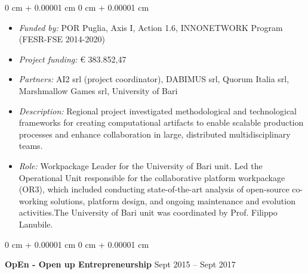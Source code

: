 \documentclass[10pt, a4paper]{article}
\newenvironment{highlights}{
    \begin{itemize}[
        topsep=0.10 cm,
        parsep=0.10 cm,
        partopsep=0pt,
        itemsep=0pt,
        leftmargin=0 cm + 10pt
    ]
}{
    \end{itemize}
} %
\newenvironment{onecolentry}{
    \begin{adjustwidth}{
        0 cm + 0.00001 cm
    }{
        0 cm + 0.00001 cm
    }
}{
    \end{adjustwidth}
} %
\newenvironment{twocolentry}[2][]{
    \onecolentry
    \def\secondColumn{#2}
    \setcolumnwidth{\fill, 4.5 cm}
    \begin{paracol}{2}
}{
    \switchcolumn \raggedleft \secondColumn
    \end{paracol}
    \endonecolentry
} %
\begin{document}
        \vspace{0.10 cm}
        \begin{onecolentry}
            \begin{highlights}
                \item \textit{Funded by:} POR Puglia, Axis I, Action 1.6, INNONETWORK Program (FESR-FSE 2014-2020)
                \item \textit{Project funding:} € 383.852,47
                \item \textit{Partners:} AI2 srl (project coordinator), DABIMUS srl, Quorum Italia srl, Marshmallow Games srl, University of Bari
                \item \textit{Description:} Regional project investigated methodological and technological frameworks for creating computational artifacts to enable scalable production processes and enhance collaboration in large, distributed multidisciplinary teams.
                \item \textit{Role:} Workpackage Leader for the University of Bari unit. Led the Operational Unit responsible for the collaborative platform workpackage (OR3), which included conducting state-of-the-art analysis of open-source co-working solutions, platform design, and ongoing maintenance and evolution activities.The University of Bari unit was coordinated by Prof. Filippo Lanubile.
            \end{highlights}
        \end{onecolentry}


        \vspace{0.2 cm}

        \begin{twocolentry}{
            Sept 2015 – Sept 2017
        }
            \textbf{OpEn - Open up Entrepreneurship}\end{twocolentry}
\end{document}
